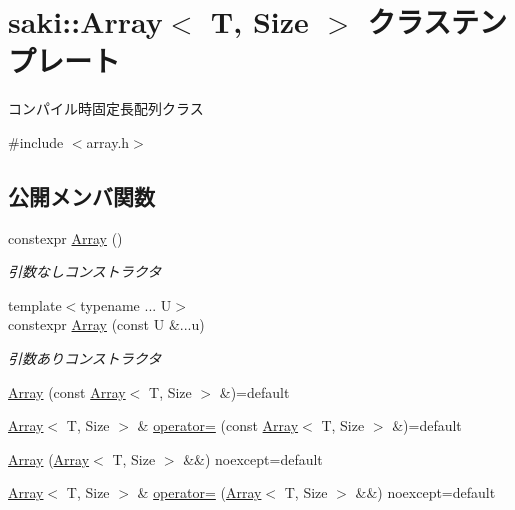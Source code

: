 \hypertarget{classsaki_1_1_array}{}\section{saki\+:\+:Array$<$ T, Size $>$ クラステンプレート}
\label{classsaki_1_1_array}


コンパイル時固定長配列クラス  




{\ttfamily \#include $<$array.\+h$>$}

\subsection*{公開メンバ関数}
\begin{DoxyCompactItemize}
\item 
constexpr \mbox{\hyperlink{classsaki_1_1_array_ab5e2245491b5c663807732f3c1d0aae7}{Array}} ()
\begin{DoxyCompactList}\small\item\em 引数なしコンストラクタ \end{DoxyCompactList}\item 
{\footnotesize template$<$typename ... U$>$ }\\constexpr \mbox{\hyperlink{classsaki_1_1_array_a74ecc29a94531923c38471eec411d652}{Array}} (const U \&...u)
\begin{DoxyCompactList}\small\item\em 引数ありコンストラクタ \end{DoxyCompactList}\item 
\mbox{\hyperlink{classsaki_1_1_array_ad556a6929d862c01d46ea34c7b7f148a}{Array}} (const \mbox{\hyperlink{classsaki_1_1_array}{Array}}$<$ T, Size $>$ \&)=default
\item 
\mbox{\hyperlink{classsaki_1_1_array}{Array}}$<$ T, Size $>$ \& \mbox{\hyperlink{classsaki_1_1_array_ab021e652e537713152ca89cc8f2b68c5}{operator=}} (const \mbox{\hyperlink{classsaki_1_1_array}{Array}}$<$ T, Size $>$ \&)=default
\item 
\mbox{\hyperlink{classsaki_1_1_array_a686fcaee74acba32d3b539c9f9583548}{Array}} (\mbox{\hyperlink{classsaki_1_1_array}{Array}}$<$ T, Size $>$ \&\&) noexcept=default
\item 
\mbox{\hyperlink{classsaki_1_1_array}{Array}}$<$ T, Size $>$ \& \mbox{\hyperlink{classsaki_1_1_array_ac84bee02284ec576151f067e4de117db}{operator=}} (\mbox{\hyperlink{classsaki_1_1_array}{Array}}$<$ T, Size $>$ \&\&) noexcept=default

\end{DoxyCompactItemize}
